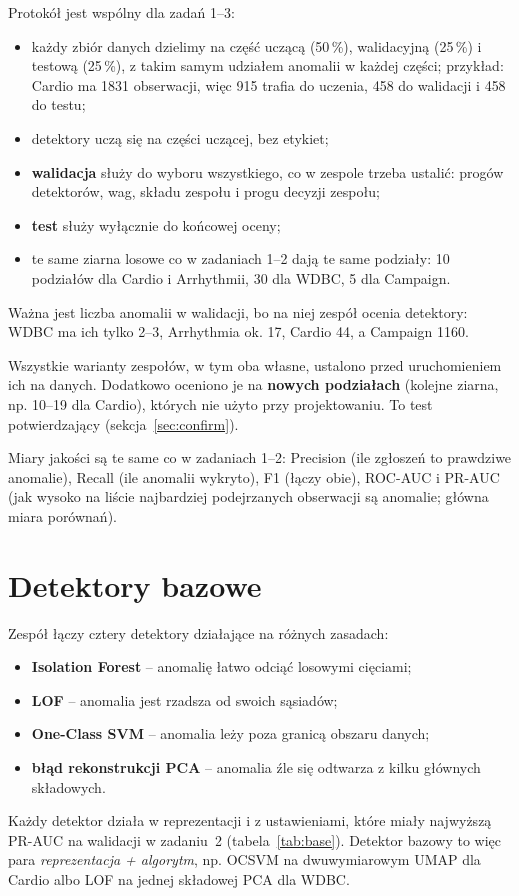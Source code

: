 \documentclass[11pt,a4paper]{article}
\begin{document}
Protokół jest wspólny dla zadań 1--3:
\begin{itemize}
  \item każdy zbiór danych dzielimy na część uczącą (50\,\%), walidacyjną
  (25\,\%) i testową (25\,\%), z takim samym udziałem anomalii w każdej
  części; przykład: Cardio ma 1831 obserwacji, więc 915 trafia do uczenia,
  458 do walidacji i 458 do testu;
  \item detektory uczą się na części uczącej, bez etykiet;
  \item \textbf{walidacja} służy do wyboru wszystkiego, co w zespole trzeba
  ustalić: progów detektorów, wag, składu zespołu i progu decyzji zespołu;
  \item \textbf{test} służy wyłącznie do końcowej oceny;
  \item te same ziarna losowe co w zadaniach 1--2 dają te same podziały:
  10 podziałów dla Cardio i Arrhythmii, 30 dla WDBC, 5 dla Campaign.
\end{itemize}
Ważna jest liczba anomalii w walidacji, bo na niej zespół ocenia detektory:
WDBC ma ich tylko 2--3, Arrhythmia ok. 17, Cardio 44, a Campaign 1160.

Wszystkie warianty zespołów, w tym oba własne, ustalono przed
uruchomieniem ich na danych. Dodatkowo oceniono je na \textbf{nowych
podziałach} (kolejne ziarna, np. 10--19 dla Cardio), których nie użyto
przy projektowaniu. To test potwierdzający (sekcja~\ref{sec:confirm}).

Miary jakości są te same co w zadaniach 1--2: Precision (ile zgłoszeń to
prawdziwe anomalie), Recall (ile anomalii wykryto), F1 (łączy obie),
ROC-AUC i PR-AUC (jak wysoko na liście najbardziej podejrzanych obserwacji
są anomalie; główna miara porównań).

\FloatBarrier
\section{Detektory bazowe}

Zespół łączy cztery detektory działające na różnych zasadach:
\begin{itemize}
  \item \textbf{Isolation Forest} -- anomalię łatwo odciąć losowymi cięciami;
  \item \textbf{LOF} -- anomalia jest rzadsza od swoich sąsiadów;
  \item \textbf{One-Class SVM} -- anomalia leży poza granicą obszaru danych;
  \item \textbf{błąd rekonstrukcji PCA} -- anomalia źle się odtwarza
  z kilku głównych składowych.
\end{itemize}
Każdy detektor działa w reprezentacji i z ustawieniami, które miały najwyższą
PR-AUC na walidacji w zadaniu~2 (tabela~\ref{tab:base}). Detektor bazowy to
więc para \emph{reprezentacja + algorytm}, np. OCSVM na dwuwymiarowym UMAP
dla Cardio albo LOF na jednej składowej PCA dla WDBC.
\end{document}
